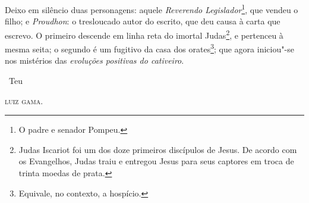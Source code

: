 \asterisc

Deixo em silêncio duas personagens: aquele \emph{Reverendo
Legislador}\footnote{O padre e senador Pompeu.}, que vendeu o filho; e
\emph{Proudhon}: o tresloucado autor do escrito, que deu causa à carta
que escrevo. O primeiro descende em linha reta do imortal
Judas\footnote{Judas Iscariot foi um dos doze primeiros discípulos de
  Jesus. De acordo com os Evangelhos, Judas traiu e entregou Jesus para
  seus captores em troca de trinta moedas de prata.}, e pertenceu à
mesma seita; o segundo é um fugitivo da casa dos orates\footnote{
  Equivale, no contexto, a hospício.}; que agora iniciou"-se nos
mistérios das \emph{evoluções positivas do cativeiro}.


\hfill\ Teu

\hfill\textsc{luiz gama.}

\paginabranca
\mbox{}\vfill
\thispagestyle{empty}

